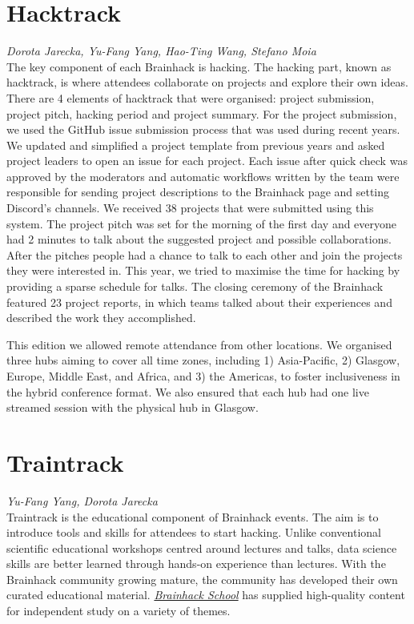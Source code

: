 \documentclass[10pt,a4paper,twocolumns]{proc}
\newcommand{\authors}[1]{\emph{\footnotesize #1} \\}
\begin{document}
\section{Hacktrack}

\authors{Dorota Jarecka, %
Yu-Fang Yang, %
Hao-Ting Wang, %
Stefano Moia}
%

The key component of each Brainhack is hacking. The hacking part, known as
hacktrack, is where attendees collaborate on projects and explore their
own ideas. There are 4 elements of hacktrack that were organised:
project submission, project pitch, hacking period and project summary.
For the project submission, we used the GitHub issue submission process
that was used during recent years. We updated and simplified a
project template from previous years and asked project leaders to open
an issue for each project. Each issue after quick check was approved by
the moderators and automatic workflows written by the team were
responsible for sending project descriptions to the Brainhack page and
setting Discord's channels. We received 38 projects that were submitted
using this system. The project pitch was set for the morning of the
first day and everyone had 2 minutes to talk about the suggested project
and possible collaborations. After the pitches people had a chance to
talk to each other and join the projects they were interested in. This
year, we tried to maximise the time for hacking by providing a sparse
schedule for talks. The closing ceremony of the Brainhack featured 23
project reports, in which teams talked about their experiences and
described the work they accomplished.

This edition we allowed remote attendance from other locations. We
organised three hubs aiming to cover all time zones, including 1)
Asia-Pacific, 2) Glasgow, Europe, Middle East, and Africa, and 3) the
Americas, to foster inclusiveness in the hybrid conference format. We also
ensured that each hub had one live streamed session with the physical
hub in Glasgow.

\section{Traintrack}
\authors{Yu-Fang Yang, %
Dorota Jarecka}
%

Traintrack is the educational component of Brainhack events. The aim is
to introduce tools and skills for attendees to start hacking. Unlike
conventional scientific educational workshops centred around lectures
and talks, data science skills are better learned through hands-on
experience than lectures. With the Brainhack community growing mature,
the community has developed their own curated educational material.
\href{https://school.brainhackmtl.org/}{\emph{Brainhack School}} has
supplied high-quality content for independent study on a variety of
themes.
\end{document}
